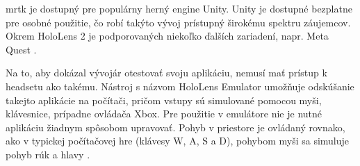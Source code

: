 \acrshort{mrtk} je dostupný pre populárny herný engine Unity. Unity je dostupné bezplatne pre osobné použitie, čo robí takýto vývoj prístupný širokému spektru záujemcov.
Okrem HoloLens 2 je podporovaných niekoľko ďalších zariadení, napr. Meta Quest \cite{microsoftWhatMixedReality}.

Na to, aby dokázal vývojár otestovať svoju aplikáciu, nemusí mať prístup k headsetu ako takému. Nástroj s názvom HoloLens Emulator umožňuje odskúšanie takejto aplikácie 
na počítači, pričom vstupy sú simulované pomocou myši, klávesnice, prípadne ovládača Xbox. Pre použitie v emulátore nie je nutné aplikáciu žiadnym spôsobom upravovať. 
Pohyb v priestore je ovládaný rovnako, ako v typickej počítačovej hre (klávesy W, A, S a D), pohybom myši sa simuluje pohyb rúk a hlavy \cite{microsoftUsingHoloLensEmulator}.



